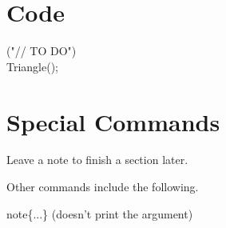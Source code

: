 \section{Code}
\begin{code}{}
    \codeitem \codepragma{} \codemessage{}("// TO DO") \\
    \stepcodelevel
        \codenew{} Triangle();\\
        \prevcodelevel
\end{code}


\section{Special Commands}
Leave a note to finish a section later.
\notfinished{}


Other commands include the following.
\begin{bulletedlist}
	\item {}
	\item {}
	\item {} \tbs{}note\{...\} (doesn't print the argument)
\end{bulletedlist} 